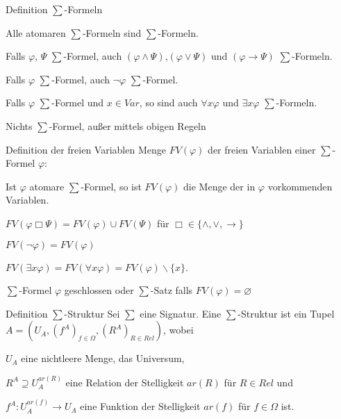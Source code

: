 \documentclass[avery5371]{flashcards}
\begin{document}
\begin{flashcard}[ Prädikatenlogik ]{ Definition $\sum$-Formeln }
    \begin{enumerate*}
        \item Alle atomaren $\sum$-Formeln sind $\sum$-Formeln.
        \item Falls $\varphi$, $\Psi$ $\sum$-Formel, auch $(\varphi\wedge\Psi)$,$(\varphi\vee\Psi)$ und $(\varphi\rightarrow\Psi)$ $\sum$-Formeln.
        \item Falls $\varphi$ $\sum$-Formel, auch $\lnot\varphi$ $\sum$-Formel.
        \item Falls $\varphi$ $\sum$-Formel und $x\in Var$, so sind auch $\forall x\varphi$ und $\exists x\varphi$ $\sum$-Formeln.
        \item Nichts $\sum$-Formel, außer mittels obigen Regeln
    \end{enumerate*}
\end{flashcard}

\begin{flashcard}[ Prädikatenlogik ]{ Definition der freien Variablen }
    Menge $FV(\varphi)$ der freien Variablen einer $\sum$-Formel $\varphi$:
    \begin{itemize*}
        \item Ist $\varphi$ atomare $\sum$-Formel, so ist $FV(\varphi)$ die Menge der in $\varphi$ vorkommenden Variablen.
        \item $FV(\varphi\Box\Psi) =FV(\varphi)\cup FV(\Psi)$ für $\Box\in\{\wedge,\vee,\rightarrow\}$
        \item $FV(\lnot\varphi) =FV(\varphi)$
        \item $FV(\exists x\varphi) =FV(\forall x\varphi) =FV(\varphi)\backslash\{x\}$.
    \end{itemize*}
    $\sum$-Formel $\varphi$ geschlossen oder $\sum$-Satz falls $FV(\varphi)=\varnothing$
\end{flashcard}

\begin{flashcard}[ Prädikatenlogik ]{ Definition $\sum$-Struktur }
    Sei $\sum$ eine Signatur. Eine $\sum$-Struktur ist ein Tupel $A=(U_A,(f^A)_{f\in\Omega},(R^A)_{R\in Rel})$, wobei
    \begin{itemize*}
        \item $U_A$ eine nichtleere Menge, das Universum,
        \item $R^A\supseteq U_A^{ar(R)}$ eine Relation der Stelligkeit $ar(R)$ für $R\in Rel$ und
        \item $f^A:U_A^{ar(f)}\rightarrow U_A$ eine Funktion der Stelligkeit $ar(f)$ für $f\in\Omega$ ist.
    \end{itemize*}
\end{flashcard}
\end{document}
